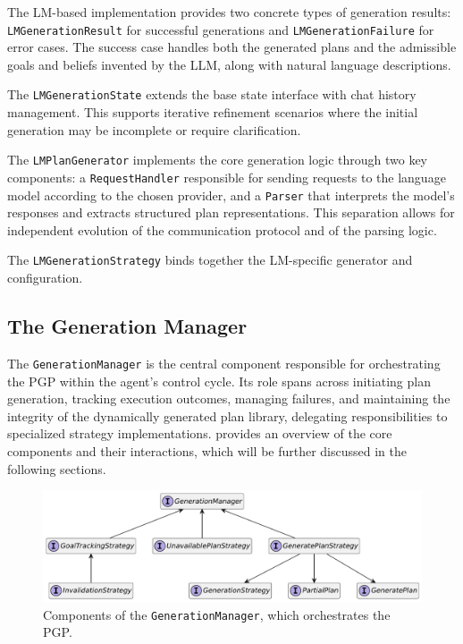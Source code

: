 \documentclass[12pt,a4paper,openright,twoside]{book}
\begin{document}
The LM-based implementation provides two concrete types of generation results: \texttt{LMGenerationResult} for successful generations and \texttt{LMGenerationFailure} for error cases.
%
The success case handles both the generated plans and the admissible goals and beliefs invented by the \ac{LLM}, along with natural language descriptions.

The \texttt{LMGenerationState} extends the base state interface with chat history management.
%
This supports iterative refinement scenarios where the initial generation may be incomplete or require clarification.

The \texttt{LMPlanGenerator} implements the core generation logic through two key components: a \texttt{RequestHandler} responsible for sending requests to the language model according to the chosen provider, and a \texttt{Parser} that interprets the model's responses and extracts structured plan representations. 
%
This separation allows for independent evolution of the communication protocol and of the parsing logic.

The \texttt{LMGenerationStrategy} binds together the LM-specific generator and configuration.

\subsection{The Generation Manager}\label{sec:generation-manager}

The \texttt{GenerationManager} is the central component responsible for orchestrating the \ac{PGP} within the agent's control cycle.
%
Its role spans across initiating plan generation, tracking execution outcomes, managing failures, and maintaining the integrity of the dynamically generated plan library, delegating responsibilities to specialized strategy implementations. 
%
 provides an overview of the core components and their interactions, which will be further discussed in the following sections.

\begin{figure}
    \centering
    \includegraphics[width=\textwidth]{figures/gen-manager.pdf}
    \caption{Components of the \texttt{GenerationManager}, which orchestrates the \ac{PGP}.}
    \label{fig:gen-manager}
\end{figure}
\end{document}
